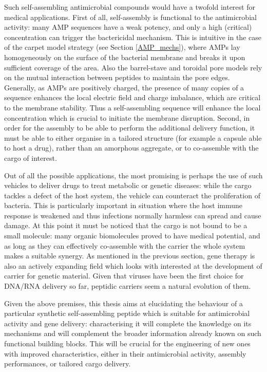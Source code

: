Such self-assembling antimicrobial compounds would have a twofold interest for medical applications.
%
First of all, self-assembly is functional to the antimicrobial activity: many AMP sequences have a weak potency, and only a high (critical) concentration can trigger the bactericidal mechanism. This is intuitive in the case of the carpet model strategy (see Section \ref{AMP_mechs}), where AMPs lay homogeneously on the surface of the bacterial membrane and breaks it upon sufficient coverage of the area. Also the barrel-stave and toroidal pore models rely on the mutual interaction between peptides to maintain the pore edges.
%
Generally, as AMPs are positively charged, the presence of many copies of a sequence enhances the local electric field and charge imbalance, which are critical to the membrane stability. Thus a self-assembling sequence will enhance the local concentration which is crucial to initiate the membrane disruption.
%
Second, in order for the assembly to be able to perform the additional delivery function, it must be able to either organise in a tailored structure (for example a capsule able to host a drug), rather than an amorphous aggregate, or to co-assemble with the cargo of interest.

Out of all the possible applications, the most promising is perhaps the use of such vehicles to deliver drugs to treat metabolic or genetic diseases: while the cargo tackles a defect of the host system, the vehicle can counteract the proliferation of bacteria. This is particularly important in situation where the host immune response is weakened and thus infections normally harmless can spread and cause damage.
%
At this point it must be noticed that the cargo is not bound to be a small molecule: many organic biomolecules proved to have medical potential, and as long as they can effectively co-assemble with the carrier the whole system makes a suitable synergy. As mentioned in the previous section, gene therapy is also an actively expanding field which looks with interested at the development of carrier for genetic material. Given that viruses have been the first choice for DNA/RNA delivery so far, peptidic carriers seem a natural evolution of them.

\bigskip
Given the above premises, this thesis aims at elucidating the behaviour of a particular synthetic self-assembling peptide which is suitable for antimicrobial activity and gene delivery: characterising it will complete the knowledge on its mechanisms and will complement the broader information already known on such functional building blocks. This will be crucial for the engineering of new ones with improved characteristics, either in their antimicrobial activity, assembly performances, or tailored cargo delivery.


